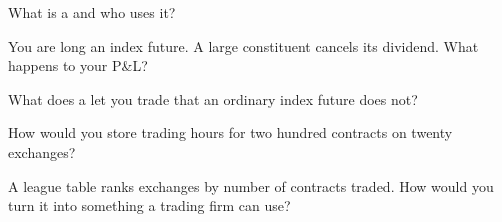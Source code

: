 \begin{interviewq}\label{iq:m1:index-and-single-stock-futures-worldwide:2}
What is a  and who uses it?
\end{interviewq}

\begin{interviewq}\label{iq:m1:index-and-single-stock-futures-worldwide:3}
You are long an index future. A large constituent cancels its dividend. What
happens to your P\&L?
\end{interviewq}

\begin{interviewq}\label{iq:m1:index-and-single-stock-futures-worldwide:4}
What does a  let you trade that an ordinary index future
does not?
\end{interviewq}

\begin{interviewq}\label{iq:m1:index-and-single-stock-futures-worldwide:5}
How would you store trading hours for two hundred contracts on twenty
exchanges?
\end{interviewq}

\begin{interviewq}\label{iq:m1:index-and-single-stock-futures-worldwide:6}
A league table ranks exchanges by number of contracts traded. How would you
turn it into something a trading firm can use?
\end{interviewq}
